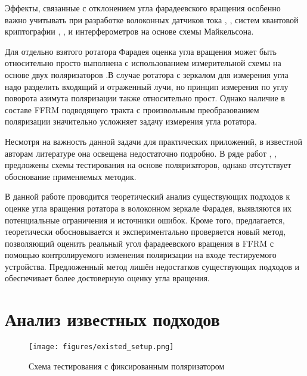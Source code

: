 \documentclass{article}
\begin{document}
Эффекты, связанные с отклонением угла фарадеевского вращения особенно важно учитывать при разработке волоконных датчиков тока \autocite{karabulutEffectFaradayMirror2019}, \autocite{wuInfluenceImperfectFaraday2022}, систем квантовой криптографии \autocite{wangEffectImperfectFaraday2013}, \autocite{sunPassiveFaradaymirrorAttack2011},\autocite{liangSecurityAnalysisContinuousvariable2019} и интерферометров на основе схемы Майкельсона.

Для отдельно взятого ротатора Фарадея оценка угла вращения может быть относительно просто выполнена с использованием измерительной схемы на основе двух поляризаторов \autocite{yinFaradayAngleAccuracy2022}.В случае ротатора с зеркалом для измерения угла надо разделить входящий и отраженный лучи, но принцип измерения по углу поворота азимута поляризации также относительно прост. Однако наличие в составе FFRM подводящего тракта с произвольным преобразованием поляризации значительно усложняет задачу измерения угла ротатора.

Несмотря на важность данной задачи для практических приложений, в известной авторам литературе она освещена недостаточно подробно.
В ряде работ \autocite{wanTwoinoneFaradayRotator2014}, \autocite{sunAllFiberOpticalFaraday2010},  \autocite{sunCompactAllfiberOptical2010} предложены схемы тестирования на основе поляризаторов, однако отсутствует обоснование применяемых методик.

В данной работе проводится теоретический анализ существующих подходов к оценке угла вращения ротатора в волоконном зеркале Фарадея, выявляются их потенциальные ограничения и источники ошибок.
Кроме того, предлагается, теоретически обосновывается и экспериментально проверяется новый метод, позволяющий оценить реальный угол фарадеевского вращения в FFRM с помощью контролируемого изменения поляризации на входе тестируемого устройства.
Предложенный метод лишён недостатков существующих подходов и обеспечивает более достоверную оценку угла вращения.

\section{Анализ известных подходов}
\begin{figure}[b]
	\centering
	\texttt{[image: figures/existed\_setup.png]}
	\caption{Схема тестирования с фиксированным поляризатором}
	\label{fig:existed_setup}
\end{figure}
\end{document}
